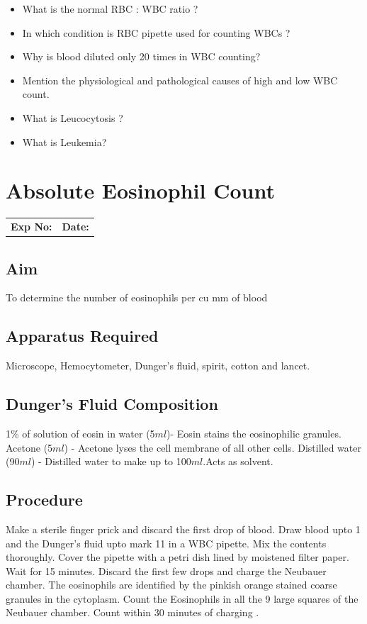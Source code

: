 \documentclass[a4paper,12pt]{book}
\begin{document}
\begin{itemize}

	\item{What is the normal RBC : WBC ratio ?}
	\item{ In which condition is RBC pipette used for counting WBCs ?}
	\item{ Why is blood diluted only 20 times in WBC counting?}
	\item{ Mention the physiological and pathological causes of high and low WBC count.}
	\item{ What is Leucocytosis ?}
	\item{ What is Leukemia?}
\end{itemize}

\chapter*{\centering Absolute Eosinophil Count}

		\begin{tabular}{p{5in} p{1in}}
			\textbf{Exp No:}  & \textbf{Date:}\\
		\end{tabular}

	\section*{Aim}

To determine the number of eosinophils per cu mm of blood
	\section*{Apparatus Required}
Microscope, Hemocytometer, Dunger’s fluid, spirit, cotton and lancet.
	\section*{Dunger's Fluid Composition}
1\% of solution of eosin in water (5$ml$)- Eosin stains the eosinophilic granules.\newline
Acetone (5$ml$) - Acetone lyses the cell membrane of all other cells.\newline
Distilled water (90$ml$) - Distilled water to make up to 100$ml$.Acts as solvent.\newline
	\section*{Procedure}
Make a sterile finger prick and discard the first drop of blood. Draw blood upto 1 and the Dunger’s fluid upto mark 11 in a WBC pipette. Mix the contents thoroughly. Cover the pipette with a petri dish lined by moistened filter paper. Wait for 15 minutes. Discard the first few drops and charge the Neubauer chamber. The eosinophils are identified by the pinkish orange stained coarse granules in the cytoplasm. Count the Eosinophils in all the 9 large squares of the Neubauer chamber. Count within 30 minutes of charging .
\end{document}
